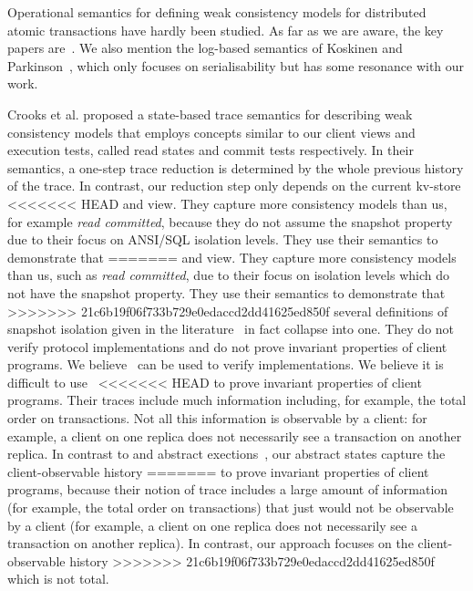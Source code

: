 {Operational semantics for defining weak consistency models for
distributed atomic transactions have  hardly been
studied. As far as we are aware, the key papers
are~\cite{seebelieve,sureshConcur,alonetogether}. 
We also mention the log-based semantics of Koskinen and Parkinson~\citet{push-pull},
which only focuses on serialisability but has some resonance with our work. 

Crooks et al. \citet{seebelieve} proposed a state-based trace
semantics for describing weak consistency models that employs concepts
similar to our client views and execution tests, called read states and
commit tests respectively.  In their semantics, a one-step trace
reduction is determined by the whole previous history of the trace.
In contrast, our reduction step only depends on the current kv-store
<<<<<<< HEAD
and view.  They capture more consistency models than us, for example  {\em
  read committed}, because they do not assume the snapshot property
due to their focus on ANSI/SQL isolation levels. They use their semantics to 
demonstrate that 
=======
and view.  They capture more consistency models than us, 
such as \emph{read committed}, due to their focus on isolation levels which do not
have the snapshot property. They use their semantics to demonstrate that 
>>>>>>> 21c6b19f06f733b729e0edaccd2dd41625ed850f
several definitions of snapshot isolation  given in the
literature~\cite{si,lazy-si,geo-si} in fact collapse into one.  They do not verify
protocol implementations and do not prove invariant properties of
client programs.  We believe~\cite{seebelieve} can be used to verify
implementations. We believe it is difficult to use~\cite{seebelieve}
<<<<<<< HEAD
to prove invariant properties of client programs.  Their 
traces include  much information including, for example,  the total
order on transactions. Not all this information is  observable by a
client: for example,  a client on one replica does not necessarily see
a transaction on another replica. In contrast to \cite{seebelieve} and abstract
exections~\cite{ev_transactions,framework-concur},  our abstract
states  capture the  client-observable history
=======
to prove invariant properties of client programs, because their notion of
trace includes a large amount of information (for example, the total
order on transactions) that just would not be observable by a
client (for example, a client on one replica does not necessarily see
a transaction on another replica).
In contrast, our approach focuses on the client-observable history
>>>>>>> 21c6b19f06f733b729e0edaccd2dd41625ed850f
which is not total. 

}
